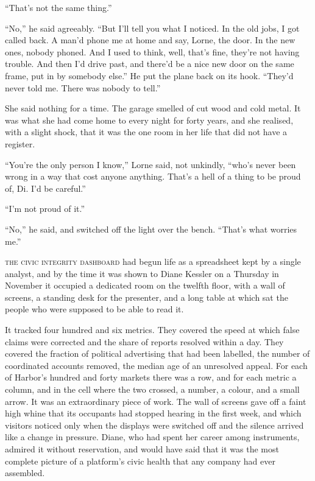 ``That's not the same thing.''

``No,'' he said agreeably. ``But I'll tell you what I noticed. In the old jobs, I got called back. A man'd phone me at home and say, Lorne, the door. In the new ones, nobody phoned. And I used to think, well, that's fine, they're not having trouble. And then I'd drive past, and there'd be a nice new door on the same frame, put in by somebody else.'' He put the plane back on its hook. ``They'd never told me. There was nobody to tell.''

She said nothing for a time. The garage smelled of cut wood and cold metal. It was what she had come home to every night for forty years, and she realised, with a slight shock, that it was the one room in her life that did not have a register.

``You're the only person I know,'' Lorne said, not unkindly, ``who's never been wrong in a way that cost anyone anything. That's a hell of a thing to be proud of, Di. I'd be careful.''

``I'm not proud of it.''

``No,'' he said, and switched off the light over the bench. ``That's what worries me.''


\textsc{the civic integrity dashboard} had begun life as a spreadsheet kept by a single analyst, and by the time it was shown to Diane Kessler on a Thursday in November it occupied a dedicated room on the twelfth floor, with a wall of screens, a standing desk for the presenter, and a long table at which sat the people who were supposed to be able to read it.

It tracked four hundred and six metrics. They covered the speed at which false claims were corrected and the share of reports resolved within a day. They covered the fraction of political advertising that had been labelled, the number of coordinated accounts removed, the median age of an unresolved appeal. For each of Harbor's hundred and forty markets there was a row, and for each metric a column, and in the cell where the two crossed, a number, a colour, and a small arrow. It was an extraordinary piece of work. The wall of screens gave off a faint high whine that its occupants had stopped hearing in the first week, and which visitors noticed only when the displays were switched off and the silence arrived like a change in pressure. Diane, who had spent her career among instruments, admired it without reservation, and would have said that it was the most complete picture of a platform's civic health that any company had ever assembled.

